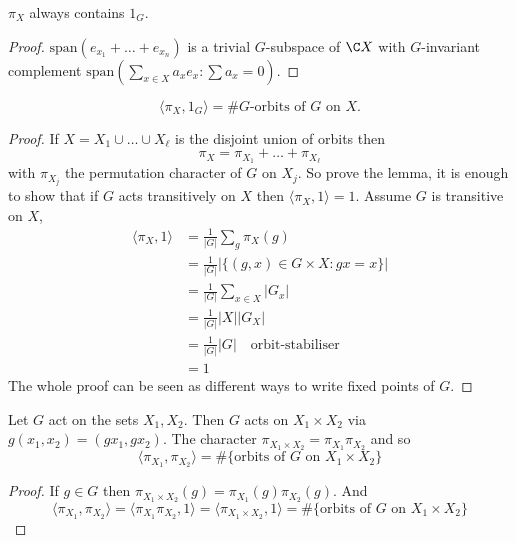 \documentclass[a4paper]{article}
\theoremstyle{definition}
\begin{document}
\begin{lemma}
  \(\pi_X\) always contains \(1_G\).
\end{lemma}

\begin{proof}
  \(\text{span}(e_{x_1} + \dots + e_{x_n})\) is a trivial \(G\)-subspace of \(\C X\) with \(G\)-invariant complement \(\text{span}(\sum_{x \in X} a_x e_x: \sum a_x = 0)\).
\end{proof}

\begin{lemma}
  \[
    \langle \pi_X, 1_G \rangle = \# G\text{-orbits of \(G\) on \(X\)}.
  \]
\end{lemma}

\begin{proof}
  If \(X = X_1 \cup \dots \cup X_\ell\) is the disjoint union of orbits then
  \[
    \pi_X = \pi_{X_1} + \dots + \pi_{X_\ell}
  \]
  with \(\pi_{X_j}\) the permutation character of \(G\) on \(X_j\). So prove the lemma, it is enough to show that if \(G\) acts transitively on \(X\) then \(\langle \pi_X, 1 \rangle = 1\). Assume \(G\) is transitive on \(X\),
  \begin{align*}
    \langle \pi_X, 1 \rangle
    &= \frac{1}{|G|} \sum_g \pi_X(g) \\
    &= \frac{1}{|G|} |\{(g, x) \in G \times X: gx = x\}| \\
    &= \frac{1}{|G|} \sum_{x \in X} |G_x| \\
    &= \frac{1}{|G|} |X| |G_X| \\
    &= \frac{1}{|G|} |G| \quad \text{orbit-stabiliser} \\
    &= 1
  \end{align*}
  The whole proof can be seen as different ways to write fixed points of \(G\).
\end{proof}

\begin{lemma}
  \label{lem:product permutation character}
  Let \(G\) act on the sets \(X_1, X_2\). Then \(G\) acts on \(X_1 \times X_2\) via \(g(x_1, x_2) = (gx_1, gx_2)\). The character \(\pi_{X_1 \times X_2} = \pi_{X_1} \pi_{X_2}\) and so
  \[
    \langle \pi_{X_1}, \pi_{X_2} \rangle
    = \#\{\text{orbits of \(G\) on \(X_1 \times X_2\)}\}
  \]
\end{lemma}

\begin{proof}
  If \(g \in G\) then \(\pi_{X_1 \times X_2}(g) = \pi_{X_1}(g) \pi_{X_2}(g)\). And
  \[
    \langle \pi_{X_1}, \pi_{X_2} \rangle
    = \langle \pi_{X_1} \pi_{X_2}, 1 \rangle
    = \langle \pi_{X_1 \times X_2}, 1 \rangle
    = \#\{\text{orbits of \(G\) on \(X_1 \times X_2\)}\}
  \]
\end{proof}
\end{document}
